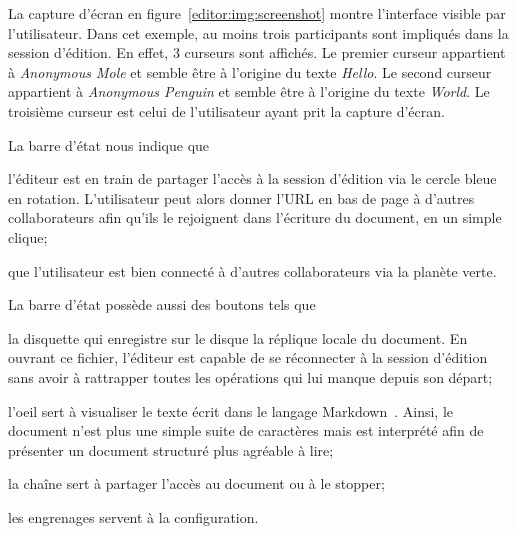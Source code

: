 La capture d'écran en figure~\ref{editor:img:screenshot} montre l'interface
visible par l'utilisateur. Dans cet exemple, au moins trois participants sont
impliqués dans la session d'édition. En effet, 3 curseurs sont affichés. Le
premier curseur appartient à \emph{Anonymous Mole} et semble être à l'origine du
texte \emph{Hello}. Le second curseur appartient à \emph{Anonymous Penguin} et
semble être à l'origine du texte \emph{World}. Le troisième curseur est celui de
l'utilisateur ayant prit la capture d'écran.

La barre d'état nous indique que
\begin{inparaenum}[(i)]
\item l'éditeur est en train de partager l'accès à la session d'édition via le
  cercle bleue en rotation. L'utilisateur peut alors donner l'URL en bas de page
  à d'autres collaborateurs afin qu'ils le rejoignent dans l'écriture du
  document, en un simple clique;
\item que l'utilisateur est bien connecté à d'autres collaborateurs via la
  planète verte.
\end{inparaenum}

La barre d'état possède aussi des boutons tels que
\begin{inparaenum}[(i)]
\item la disquette qui enregistre sur le disque la réplique locale du
  document. En ouvrant ce fichier, l'éditeur est capable de se réconnecter à la
  session d'édition sans avoir à rattrapper toutes les opérations qui lui manque
  depuis son départ;
\item l'oeil sert à visualiser le texte écrit dans le langage
  Markdown~\cite{markdown}. Ainsi, le document n'est plus une simple suite de
  caractères mais est interprété afin de présenter un document structuré plus
  agréable à lire;
\item la chaîne sert à partager l'accès au document ou à le stopper;
\item les engrenages servent à la configuration.
\end{inparaenum}


